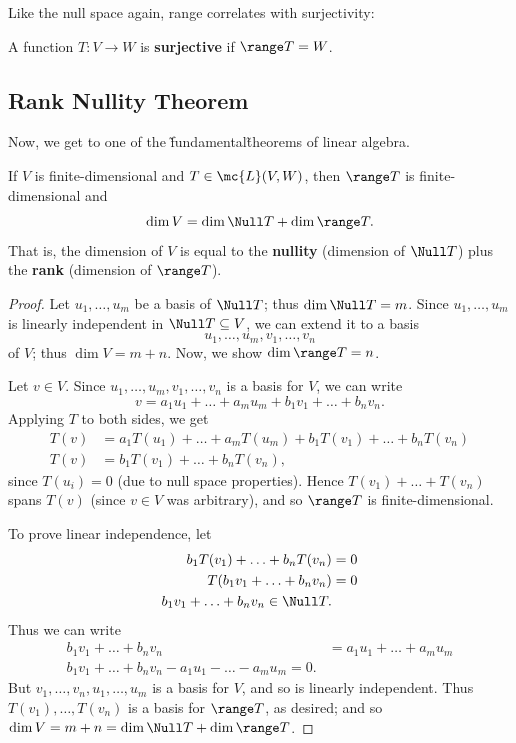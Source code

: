 \documentclass[math0540-lecture-notes.tex]{subfiles}
\begin{document}
Like the null space again, range correlates with surjectivity:
\begin{definition}[Surjectivity]{}
  A function $T:V\to W$ is \textbf{surjective} if $\range T = W$.
\end{definition}

\subsection{Rank Nullity Theorem}
Now, we get to one of the \~fundamental\~ theorems of linear algebra.
\begin{theorem}{}
  If $V$ is finite-dimensional and $T\in \mc{L}(V,W)$, then $\range T$ is finite-dimensional and \[
    \dim V = \dim \Null T + \dim \range T
  .\] That is, the dimension of $V$ is equal to the \textbf{nullity} (dimension of $\Null T$) plus
  the \textbf{rank} (dimension of $\range T$).
\end{theorem}
\begin{proof}[Proof]
  Let $u_1,\ldots,u_m$ be a basis of $\Null T$; thus $\dim \Null T=m$. Since $u_1,\ldots,u_m$ is
  linearly independent in $ \Null T \subseteq V$, we can extend it to a basis \[
    u_1,\ldots,u_m,v_1,\ldots,v_n
  \] of $V$; thus $\dim V = m + n$. Now, we show $\dim\range T=n$.

  Let $v\in V$. Since $ u_1,\ldots,u_m,v_1,\ldots,v_n$ is a basis for $V$, we can write \[
    v = a_1u_1+\ldots+a_mu_m+b_1v_1+\ldots+b_nv_n
  .\] Applying $T$ to both sides, we get
  \begin{align*}
    T(v) &= a_1T(u_1)+\ldots+a_mT(u_m)+b_1T(v_1)+\ldots+b_nT(v_n)\\
    T(v)&= b_1T(v_1)+\ldots+b_nT(v_n)
  ,\end{align*} since $T(u_i)=0$ (due to null space properties). Hence  $T(v_1)+\ldots+T(v_n)$ spans
  $T(v)$ (since $v\in V$ was arbitrary), and so $\range T$ is finite-dimensional.

  To prove linear independence, let
  \begin{align*}
    b_1T(v_1)+\ldots+b_nT(v_n)&=0\\
    T(b_1v_1+\ldots+b_nv_n)&= 0 \\
    b_1v_1+\ldots+b_nv_n\in \Null T
  .\end{align*} Thus we can write
  \begin{align*}
    b_1v_1+\ldots+b_nv_n&=a_1u_1+\ldots+a_mu_m\\
    b_1v_1+\ldots+b_nv_n-a_1u_1-\ldots-a_mu_m=0
  .\end{align*} But $v_1,\ldots,v_n,u_1,\ldots,u_m$ is a basis for $V$, and so is linearly
  independent. Thus $T(v_1),\ldots,T(v_n)$ is a basis for $\range T$, as desired; and so $\dim V = m
  + n = \dim\Null T + \dim\range T$.
\end{proof}
\end{document}
